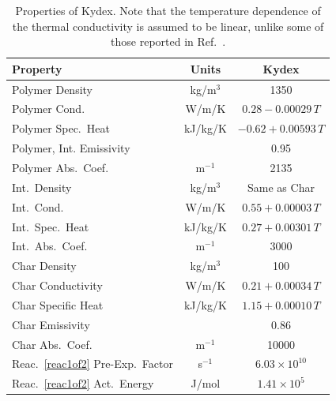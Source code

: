 \begin{table}[!h]
\caption[Properties of Kydex]{Properties of Kydex. Note that the temperature dependence of the thermal conductivity is assumed to be linear, unlike some of those reported in Ref.~\cite{Li:Thesis}.}
\centering
\begin{tabular}{|l|c|c|}
\hline
Property                                 & Units         & Kydex                    \\ \hline \hline
Polymer Density                          & kg/m$^3$      & 1350                     \\ \hline
Polymer Cond.                            & W/m/K         & $0.28-0.00029 \, T$      \\ \hline
Polymer Spec.~Heat                       & kJ/kg/K       & $-0.62+0.00593  \, T$    \\ \hline
Polymer, Int. Emissivity                 &               & 0.95                     \\ \hline
Polymer Abs.~Coef.                       & m$^{-1}$      & 2135                     \\ \hline
Int.~Density                             & kg/m$^3$      & Same as Char             \\ \hline
Int.~Cond.                               & W/m/K         & $0.55+0.00003 \, T$      \\ \hline
Int.~Spec.~Heat                          & kJ/kg/K       & $0.27+0.00301  \, T$     \\ \hline
Int.~Abs.~Coef.                          & m$^{-1}$      & 3000                     \\ \hline
Char Density                             & kg/m$^3$      & 100                      \\ \hline
Char Conductivity                        & W/m/K         & $0.21+0.00034 \, T$      \\ \hline
Char Specific Heat                       & kJ/kg/K       & $1.15+0.00010 \, T$      \\ \hline
Char Emissivity                          &               & 0.86                     \\ \hline
Char Abs.~Coef.                          & m$^{-1}$      & 10000                    \\ \hline
Reac.~\ref{reac1of2} Pre-Exp.~Factor     & s$^{-1}$      & $6.03\times 10^{10}$     \\ \hline
Reac.~\ref{reac1of2} Act.~Energy         & J/mol       & $1.41\times 10^5$        \\ \hline

\end{tabular}
\end{table}
